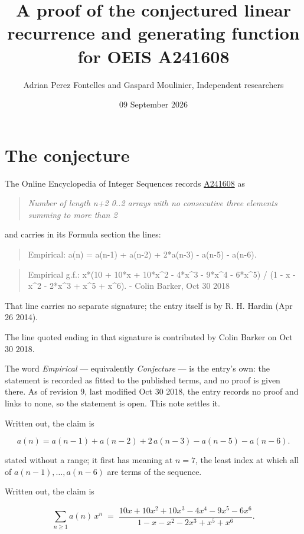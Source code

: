 \documentclass[11pt]{article}
\title{A proof of the conjectured linear recurrence and generating function for OEIS A241608}
\author{Adrian Perez Fontelles and Gaspard Moulinier, Independent researchers}
\date{09 September 2026}
\theoremstyle{definition}
\begin{document}
\maketitle
\section{The conjecture}

The Online Encyclopedia of Integer Sequences records \href{https://oeis.org/A241608}{A241608} as

\begin{quote}\itshape Number of length n+2 0..2 arrays with no consecutive three elements summing to more than 2\end{quote}

and carries in its Formula section the lines:

\begin{quote}\ttfamily Empirical: a(n) = a(n-1) + a(n-2) + 2*a(n-3) - a(n-5) - a(n-6).\end{quote}

\begin{quote}\ttfamily Empirical g.f.: x*(10 + 10*x + 10*x\textasciicircum{}2 - 4*x\textasciicircum{}3 - 9*x\textasciicircum{}4 - 6*x\textasciicircum{}5) / (1 - x - x\textasciicircum{}2 - 2*x\textasciicircum{}3 + x\textasciicircum{}5 + x\textasciicircum{}6). - Colin Barker, Oct 30 2018\end{quote}

That line carries no separate signature; the entry itself is by R. H. Hardin (Apr 26 2014).

The line quoted ending in that signature is contributed by Colin Barker on Oct 30 2018.

The word {\itshape Empirical} --- equivalently {\itshape Conjecture} --- is the entry's own: the statement is recorded as fitted to the published terms, and no proof is given there. As of revision 9, last modified Oct 30 2018, the entry records no proof and links to none, so the statement is open. This note settles it.

Written out, the claim is

\[a(n) = a(n-1) + a(n-2) + 2\,a(n-3) - a(n-5) - a(n-6).\]

stated without a range; it first has meaning at $n = 7$, the least index at which all of $a(n-1),\dots,a(n-6)$ are terms of the sequence.

Written out, the claim is

\[\sum_{n \ge 1} a(n)\,x^n \;=\; \frac{10x + 10x^{2} + 10x^{3} - 4x^{4} - 9x^{5} - 6x^{6}}{1 - x - x^{2} - 2x^{3} + x^{5} + x^{6}}.\]
\end{document}
